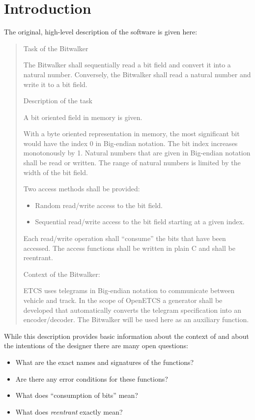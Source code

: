 
\chapter{Introduction}
\label{sec:introduction}

The original, high-level description of the \bitwalker software is given here:

\begin{quote}
 
Task of the Bitwalker
 
The Bitwalker shall sequentially read a bit field and convert it into a natural number.
Conversely, the Bitwalker shall read a natural number and write it to a bit field.
 
Description of the task
 
A bit oriented field in memory is given.

With a byte oriented representation in memory, the most significant bit
would have the index 0 in Big-endian notation.
The bit index increases monotonously by 1.
Natural numbers that are given in Big-endian notation shall be read or written.
The range of natural numbers is limited by the width of the bit field.

Two access methods shall be provided:
\begin{itemize}
\item  Random read/write access to the bit field. 
\item  Sequential read/write access to the bit field starting at a given index.
\end{itemize}

Each read/write operation shall ``consume'' the bits that have been accessed.
The access functions shall be written in plain C and shall be reentrant.
 
Context of the Bitwalker:
 
ETCS uses telegrams in Big-endian notation to communicate between vehicle and track.
In the scope of OpenETCS a generator shall be developed that
automatically converts the telegram specification into an encoder/decoder.
The Bitwalker will be used here as an auxiliary function.
\end{quote}

While this description provides basic information about the context
of \bitwalker and about the intentions of the designer there are 
many open questions:

\begin{itemize}
\item What are the exact names and signatures of the functions?
\item Are there any error conditions for these functions?
\item What does ``consumption of bits'' mean?
\item What does \emph{reentrant} exactly mean?
\end{itemize}


